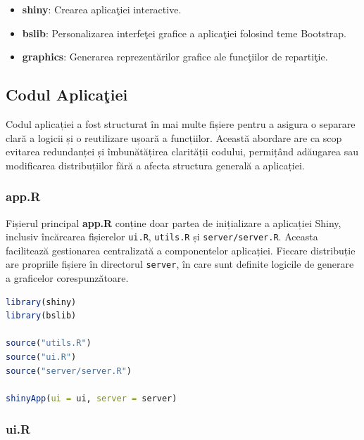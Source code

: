 \documentclass[a4paper,11pt]{article}
\begin{document}
\begin{itemize}
    \item \textbf{shiny}: Crearea aplica\c{t}iei interactive.
    \item \textbf{bslib}: Personalizarea interfe\c{t}ei grafice a aplica\c{t}iei folosind teme Bootstrap.
    \item \textbf{graphics}: Generarea reprezent\u{a}rilor grafice ale func\c{t}iilor de reparti\c{t}ie.
\end{itemize}

\newpage

\subsection*{Codul Aplica\c{t}iei}

Codul aplicației a fost structurat în mai multe fișiere pentru a asigura o separare clară a logicii și o reutilizare ușoară a funcțiilor. Această abordare are ca scop evitarea redundanței și îmbunătățirea clarității codului, permițând adăugarea sau modificarea distribuțiilor fără a afecta structura generală a aplicației.

\subsubsection*{app.R}

Fișierul principal \textbf{app.R} conține doar partea de inițializare a aplicației Shiny, inclusiv încărcarea fișierelor \texttt{ui.R}, \texttt{utils.R} și \texttt{server/server.R}. Aceasta facilitează gestionarea centralizată a componentelor aplicației.
Fiecare distribuție are propriile fișiere în directorul \texttt{server}, în care sunt definite logicile de generare a graficelor corespunzătoare.

\begin{lstlisting}[language=R, basicstyle=\ttfamily\footnotesize, keywordstyle=\color{blue}\bfseries, commentstyle=\color{green!60!black}, stringstyle=\color{orange}]
library(shiny)
library(bslib)

source("utils.R")
source("ui.R")
source("server/server.R")

shinyApp(ui = ui, server = server)
\end{lstlisting}

\subsubsection*{ui.R}
\end{document}
